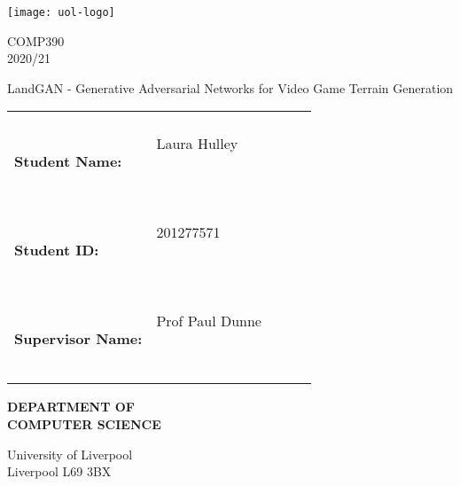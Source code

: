 \begin{titlepage}
    \begin{center}
        \texttt{[image: uol-logo]}

        \vspace{5em}

        \Large{COMP390}
        \vspace{1em}
        \Large{\\2020/21}

        \vspace{3em}

        \Large{LandGAN - Generative Adversarial Networks for Video Game Terrain Generation}

        \vspace{3em}

        \begin{tabular}{|lp{5.0cm}lll|}
            \hline
                                      &                    &  &   & \\
            \textbf{Student Name:}    & Laura Hulley

            \                         &                    &  &     \\
            \textbf{Student ID:}      & 201277571

            \                         &                    &  &     \\
            \textbf{Supervisor Name:} & Prof Paul Dunne

            \                         &                    &  &     \\
            \hline
        \end{tabular}

        \vspace{3em}

        \LARGE{{\textbf{DEPARTMENT OF\\
                        COMPUTER SCIENCE}}}

        \vspace{2em}

        University of Liverpool\\Liverpool L69 3BX

    \end{center}



\end{titlepage}